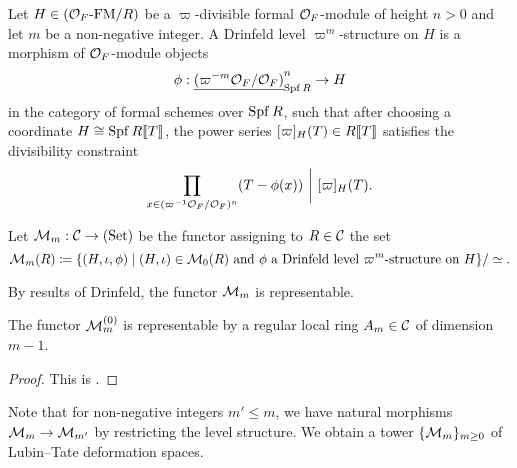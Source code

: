 \documentclass[../main.tex]{subfiles}
\begin{document}
\begin{defi}
  Let $H \in {({\mathcal{O}_F}\text-\allowbreak\mathrm{FM}/{R})}$ be a $\varpi$-divisible formal $\mathcal{O}_F$-module
  of height $n>0$ and let $m$ be a non-negative 
  integer. A Drinfeld level $\varpi^m$-structure on $H$ is a morphism of
  $\mathcal{O}_F$-module objects 
  \begin{equation*}
    \phi: \underline{(\varpi^{-m}\mathcal{O}_F/\mathcal{O}_F)}_{\operatorname{Spf} R}^n \to H
  \end{equation*}
  in the category of formal schemes over $\operatorname{Spf} R$,
  such that after choosing a coordinate $H \cong \operatorname{Spf} R\llbracket T \rrbracket$, the 
  power series $[\varpi]_H(T) \in R\llbracket T \rrbracket$ satisfies the divisibility constraint
  \begin{equation*}
    \prod_{x \in (\varpi^{-1}\mathcal{O}_F/\mathcal{O}_F)^n}(T - \phi(x)) \ \bigg\vert \ [\varpi]_H(T).
  \end{equation*}
\end{defi}

\begin{defi}\label{def:LTDefSpaceWithLevel}
  Let $\mathcal{M}_m: \mathcal{C} \to {(\mathrm{Set})}$ be the functor assigning to $R \in \mathcal{C}$ the set 
  \begin{equation*}
    \mathcal{M}_m(R) \coloneqq \{(H, \iota, \phi) \mid (H, \iota) \in \mathcal{M}_0(R) \text{ and }\phi
    \text{ a Drinfeld level $\varpi^m$-structure on $H$}\}/\simeq.
  \end{equation*}
\end{defi}

By results of Drinfeld, the functor $\mathcal{M}_m$ is representable.

\begin{thm}\label{thm:RepresentabilityOfDefSpaceWithLevel}
  The functor $\mathcal{M}_m^{(0)}$ is representable by a regular local ring $A_m \in \mathcal{C}$ of 
  dimension $m-1$.
\begin{proof}
  This is \cite[Proposition 4.3]{drinfel1974elliptic}.
\end{proof}
\end{thm}

Note that for non-negative integers $m' \leq m$, we have natural morphisms $\mathcal{M}_m
\to \mathcal{M}_{m'}$ by restricting the level structure. We obtain a tower
$\{\mathcal{M}_m\}_{m \geq 0}$ of Lubin--Tate deformation spaces.
\end{document}
